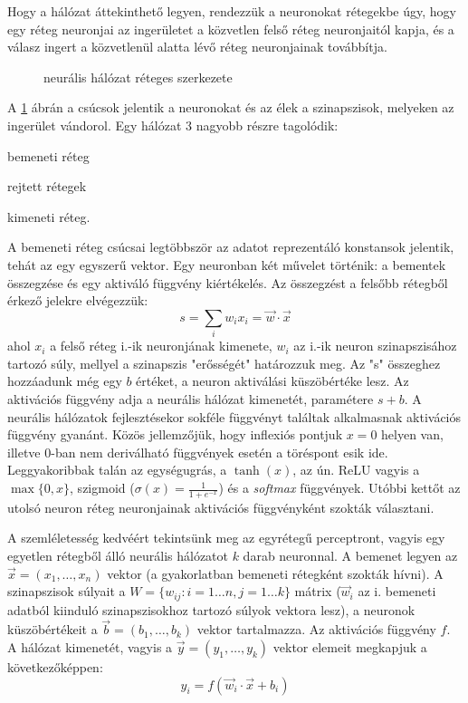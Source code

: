 Hogy a hálózat áttekinthető legyen, rendezzük a neuronokat rétegekbe úgy, hogy egy réteg neuronjai az ingerületet a közvetlen felső réteg neuronjaitól kapja, és a válasz ingert a közvetlenül alatta lévő réteg neuronjainak továbbítja.
\begin{figure}
	\centering
	\def\svgwidth{0.5\columnwidth}
	
	\caption{neurális hálózat réteges szerkezete \protect \footnotemark}
	\label{fig:neuralNet}
\end{figure}
A \ref{fig:neuralNet} ábrán a csúcsok jelentik a neuronokat és az élek a szinapszisok, melyeken az ingerület vándorol. Egy hálózat 3 nagyobb részre tagolódik:
\begin{enumerate*}[label={\alph*)},font=\bfseries]
	\item bemeneti réteg
	\item rejtett rétegek
	\item kimeneti réteg.
\end{enumerate*}
A bemeneti réteg csúcsai legtöbbször az adatot reprezentáló konstansok jelentik, tehát az egy egyszerű vektor.
Egy neuronban két művelet történik: a bementek összegzése és egy aktiváló függvény kiértékelés. Az összegzést a felsőbb rétegből érkező jelekre elvégezzük:
\begin{equation}
	s = \sum_i{w_ix_i} = \vec{w}\cdot\vec{x}
\end{equation}
ahol $x_i$ a felső réteg i.-ik neuronjának kimenete, $w_i$ az i.-ik neuron szinapszisához tartozó súly, mellyel a szinapszis "erősségét" határozzuk meg. Az "s" összeghez hozzáadunk még egy $b$ értéket, a neuron aktiválási küszöbértéke lesz.
Az aktivációs függvény adja a neurális hálózat kimenetét, paramétere $s+b$.
A neurális hálózatok fejlesztésekor sokféle függvényt találtak alkalmasnak aktivációs függvény gyanánt. Közös jellemzőjük, hogy inflexiós pontjuk $x=0$ helyen van, illetve 0-ban nem deriválható függvények esetén a töréspont esik ide. Leggyakoribbak talán az egységugrás, a $\tanh(x)$, az ún. ReLU vagyis a $\max\{0,x\}$, szigmoid ($\sigma(x)= \frac{1}{1+e^{-x}}$) és a \emph{softmax} függvények. Utóbbi kettőt az utolsó neuron réteg neuronjainak aktivációs függvényként szokták választani.

A szemléletesség kedvéért tekintsünk meg az egyrétegű perceptront, vagyis egy egyetlen rétegből álló neurális hálózatot $k$ darab neuronnal. A bemenet legyen az $\vec{x}=(x_1,\dots,x_n)$ vektor (a gyakorlatban bemeneti rétegként szokták hívni). A szinapszisok súlyait a $W=\{w_{ij}:i=1\dots n,j=1\dots k\}$  mátrix ($\vec{w}_i$ az i. bemeneti adatból kiinduló szinapszisokhoz tartozó súlyok vektora lesz), a neuronok küszöbértékeit a $\vec{b}=(b_1,\dots,b_k)$ vektor tartalmazza. Az aktivációs függvény $f$. A hálózat kimenetét, vagyis a  $\vec{y}=(y_1,\dots,y_k)$ vektor elemeit megkapjuk a következőképpen:
\begin{equation}
	y_i = f(\vec{w}_i\cdot\vec{x}+b_i)
\end{equation}

